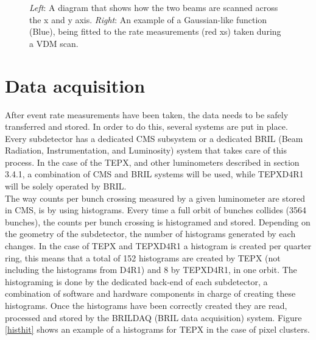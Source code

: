 \begin{figure}[ht]
\begin{minipage}[b]{0.5\linewidth}

\end{minipage}
\caption[vdM scan process.]{\textit{Left}: A diagram that shows how the two beams are scanned across the x and y axis. \textit{ Right}: An example of a Gaussian-like function (Blue), being fitted to the rate measurements (red xs) taken during a VDM scan.}
\label{vdm1}
\end{figure}


\section{Data acquisition}
After event rate measurements have been taken, the data needs to be safely transferred and stored. In order to do this, several systems are put in place. Every subdetector has a dedicated CMS subsystem or a dedicated BRIL (Beam Radiation, Instrumentation, and Luminosity) system that takes care of this process. In the case of the TEPX, and other luminometers described in section 3.4.1, a combination of CMS and BRIL systems will be used, while TEPXD4R1 will be solely operated by BRIL.\\
The way counts per bunch crossing measured by a given luminometer are stored in CMS, is by using histograms. Every time a full orbit of bunches collides (3564 bunches), the counts per bunch crossing is histogramed and stored. Depending on the geometry of the subdetector, the number of histograms generated by each changes. In the case of TEPX and TEPXD4R1 a histogram is created per quarter ring, this means that a total of 152 histograms are created by TEPX (not including the histograms from D4R1) and 8 by TEPXD4R1, in one orbit. The histograming is done by the dedicated back-end of each subdetector, a combination of software and hardware components in charge of creating these histograms. Once the histograms have been correctly created they are read, processed and stored by the BRILDAQ (BRIL data acquisition) system. Figure \ref{histhit} shows an example of a histograms for TEPX in the case of pixel clusters.

